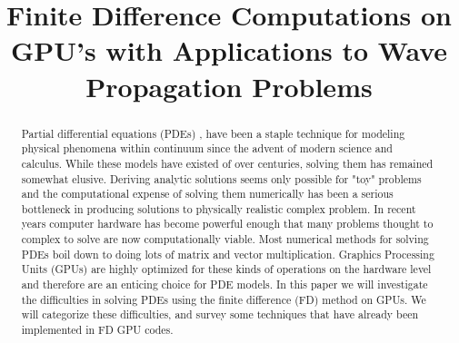 \documentclass[conference]{IEEEtran}
\begin{document}
\title{Finite Difference Computations on GPU's with Applications to Wave Propagation Problems\\
}

\author{
}

\maketitle

\begin{abstract}
Partial differential equations (PDEs) , have been a staple technique for modeling physical phenomena within continuum since the advent of modern science and calculus. While these models have existed of over centuries, solving them has remained somewhat elusive. Deriving analytic solutions seems only possible for "toy" problems and the computational expense of solving them numerically has been a serious bottleneck in producing solutions to physically realistic complex problem. In recent years computer hardware has become powerful enough that many problems thought  to complex to solve are now computationally viable. Most numerical methods for solving PDEs  boil down to doing lots of matrix and vector multiplication. Graphics Processing Units (GPUs) are highly optimized for these kinds of operations on the hardware level and therefore are an enticing choice for PDE models. In this paper we will investigate the difficulties in solving PDEs using the finite difference (FD) method on GPUs. We will categorize these difficulties, and survey some techniques that have already been implemented in FD GPU codes.
\end{abstract}
\end{document}

